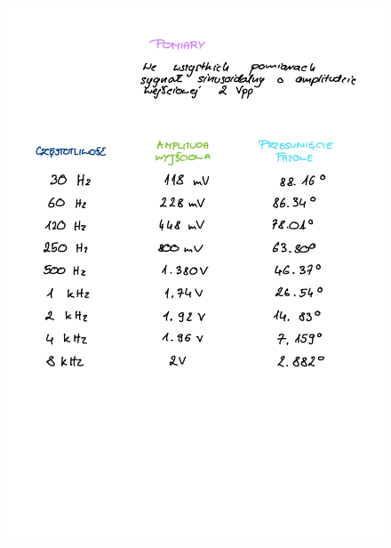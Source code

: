 \documentclass[14pt, table]{extarticle}
\begin{document}
\begin{figure}[H]
\includegraphics[scale=0.2]{B1}
\centering
\captionsetup{labelformat=empty}
\caption{}
\end{figure}
\end{document}
